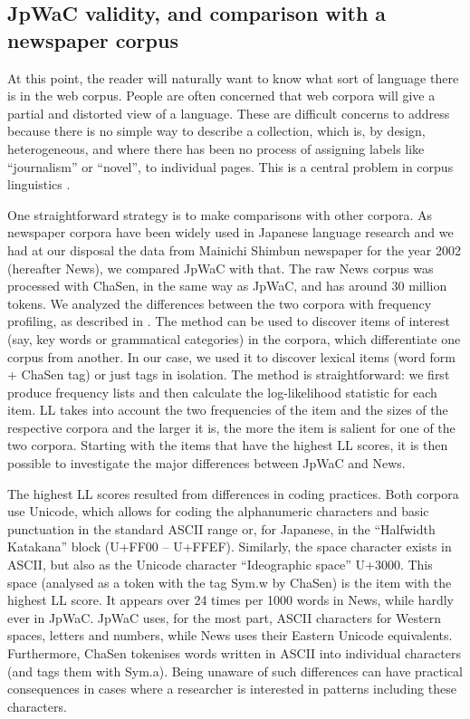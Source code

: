 \documentclass[english]{jnlp_1.4}
\begin{document}
\subsection{JpWaC validity, and comparison with a newspaper corpus}

At this point, the reader will naturally want to know what sort of language there is in the web corpus. People are often concerned that web corpora will give a partial and distorted view of a language. These are difficult concerns to address because there is no simple way to describe a collection, which is, by design, heterogeneous, and where there has been no process of assigning labels like ``journalism'' or ``novel'', to individual pages. This is a central problem in corpus linguistics .

One straightforward strategy is to make comparisons with other
corpora. As newspaper corpora have been widely used in Japanese
language research and we had at our disposal the data from Mainichi
Shimbun newspaper for the year 2002 (hereafter News), we compared
JpWaC with that. The raw News corpus was processed with ChaSen, in the
same way as JpWaC, and has around 30 million tokens. We analyzed the
differences between the two corpora with frequency profiling, as
described in . The method can be used to discover
items of interest (say, key words or grammatical categories) in the
corpora, which differentiate one corpus from another. In our case, we
used it to discover lexical items (word form + ChaSen tag) or just
tags in isolation. The method is straightforward: we first produce
frequency lists and then calculate the log-likelihood statistic for
each item. LL takes into account the two frequencies of the item and
the sizes of the respective corpora and the larger it is, the more the
item is salient for one of the two corpora. Starting with the items
that have the highest LL scores, it is then possible to investigate
the major differences between JpWaC and News.

The highest LL scores resulted from differences in coding practices. Both corpora use Unicode, which allows for coding the alphanumeric characters and basic punctuation in the standard ASCII range or, for Japanese, in the ``Halfwidth Katakana'' block (U+FF00 -- U+FFEF). Similarly, the space character exists in ASCII, but also as the Unicode character ``Ideographic space'' U+3000. This space (analysed as a token with the tag Sym.w by ChaSen) is the item with the highest LL score. It appears over 24 times per 1000 words in News, while hardly ever in JpWaC. JpWaC uses, for the most part, ASCII characters for Western spaces, letters and numbers, while News uses their Eastern Unicode equivalents. Furthermore, ChaSen tokenises words written in ASCII into individual characters (and tags them with Sym.a). Being unaware of such differences can have practical consequences in cases where a researcher is interested in patterns including these characters.
\end{document}
